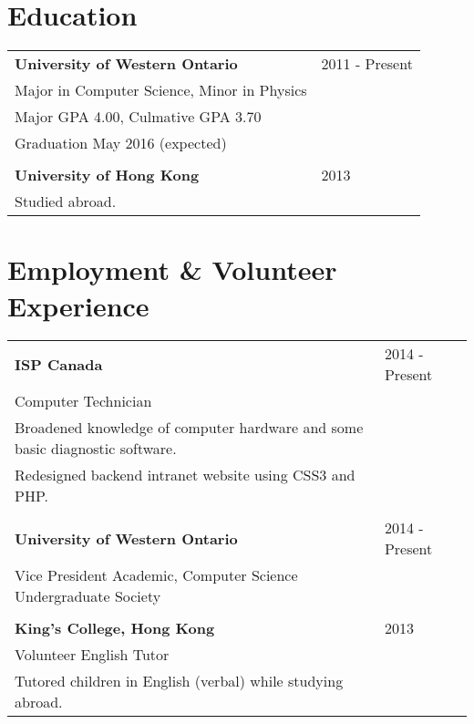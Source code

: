 \documentclass{article}
\def \resumeitem {\bf}
\def \resumedate {}
\def \resumedetails {\small}
\begin{document}
\begin{minipage}[t]{0.7\hsize} %
	
	\section{Education}
	
		\begin{tabular}{p{}p{}}
			\resumeitem{University of Western Ontario} & \resumedate{2011 - Present}\\
			Major in Computer Science, Minor in Physics &\\
			\resumedetails{Major GPA 4.00, Culmative GPA 3.70} &\\
			\resumedetails{Graduation May 2016 (expected)} &\\
			\\
			\resumeitem{University of Hong Kong} & \resumedate{2013}\\
			Studied abroad. &
		\end{tabular}
		
	\vspace{7mm}
	
	\section{Employment \& Volunteer Experience}
	
		\begin{tabular}{p{}p{}}
			\resumeitem{ISP Canada} & \resumedate{2014 - Present}\\
			Computer Technician &\\
			\resumedetails{Broadened knowledge of computer hardware and some basic diagnostic software.} &\\
			\resumedetails{Redesigned backend intranet website using CSS3 and PHP.} &\\
			&\\
			\resumeitem{University of Western Ontario} & \resumedate{2014 - Present}\\
			Vice President Academic, Computer Science Undergraduate Society &\\
			&\\
			\resumeitem{King's College, Hong Kong} & \resumedate{2013}\\
			Volunteer English Tutor&\\
			\resumedetails{Tutored children in English (verbal) while studying abroad.} &\\
		\end{tabular}
	

\end{minipage}
\end{document}
